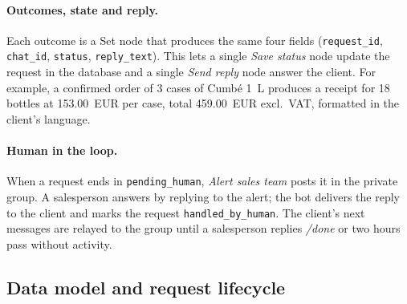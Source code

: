 \documentclass[11pt,a4paper]{article}
\newcommand{\nd}[1]{\emph{#1}}             %
\newcommand{\st}[1]{\texttt{#1}}           %
\begin{document}
\paragraph{Outcomes, state and reply.} Each outcome is a Set node that produces the same four
fields (\st{request\_id}, \st{chat\_id}, \st{status}, \st{reply\_text}). This lets a single
\nd{Save status} node update the request in the database and a single \nd{Send reply} node
answer the client. For example, a confirmed order of 3 cases of Cumbé 1~L produces a receipt for
18 bottles at 153.00~EUR per case, total 459.00~EUR excl.~VAT, formatted in the client's language.

\paragraph{Human in the loop.} When a request ends in \st{pending\_human}, \nd{Alert sales
team} posts it in the private group. A salesperson answers by replying to the alert; the bot
delivers the reply to the client and marks the request \st{handled\_by\_human}. The client's
next messages are relayed to the group until a salesperson replies \emph{/done} or two hours pass
without activity.

\subsection{Data model and request lifecycle}
\end{document}
